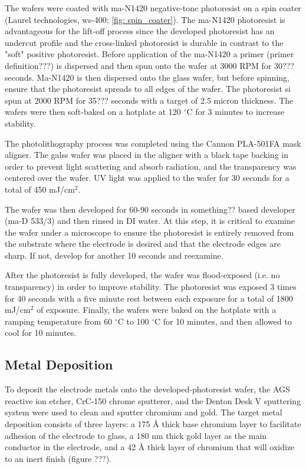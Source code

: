 \par The wafers were coated with ma-N1420 negative-tone photoresist on a spin coater (Laurel technologies, ws-400; \ref{fig: spin_coater}). The ma-N1420 photoresist is advantageous for the lift-off process since the developed photoresist has an undercut profile and the cross-linked photoresist is durable in contrast to the "soft" positive photoresist. Before application of the ma-N1420 a primer (primer definition???) is dispersed and then spun onto the wafer at 3000 RPM for 30??? seconds. Ma-N1420 is then dispersed onto the glass wafer, but before spinning, ensure that the photoresist spreads to all edges of the wafer. The photoresist si spun at 2000 RPM for 35??? seconds with a target of 2.5 micron thickness. The wafers were then soft-baked on a hotplate at 120 $^\circ$C for 3 minutes to increase stability. 

\par The photolithography process was completed using the Cannon PLA-501FA mask aligner. The galss wafer was placed in the aligner with a black tape backing in order to prevent light scattering and absorb radiation, and the transparency was centered over the wafer. UV light was applied to the wafer for 30 seconds for a total of 450 mJ/cm$^2$. 

\par The wafer was then developed for 60-90 seconds in something?? based developer (ma-D 533/3) and then rinsed in DI water. At this step, it is critical to examine the wafer under a microscope to ensure the photoresist is entirely removed from the substrate where the electrode is desired and that the electrode edges are sharp. If not, develop for another 10 seconds and reexamine. 

\par After the photoresist is fully developed, the wafer was flood-exposed (i.e. no transparency) in order to improve stability. The photoresist was exposed 3 times for 40 seconds with a five minute rest between each exposure for a total of 1800 mJ/cm$^2$ of exposure. Finally, the wafers were baked on the hotplate with a ramping temperature from 60 $^\circ$C to 100 $^\circ$C for 10 minutes, and then allowed to cool for 10 minutes. 

\subsection*{Metal Deposition}

\par To deposit the electrode metals onto the developed-photoresist wafer, the AGS reactive ion etcher, CrC-150 chrome sputterer, and the Denton Desk V sputtering system were used to clean and sputter chromium and gold. The target metal deposition consists of three layers: a 175 \si{\angstrom} thick base chromium layer to facilitate adhesion of the electrode to glass, a 180 nm thick gold layer as the main conductor in the electrode, and a 42 \si{\angstrom} thick layer of chromium that will oxidize to an inert finish (figure ???).

